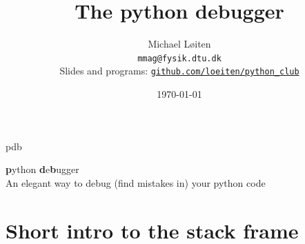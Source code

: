 \documentclass[
    size=20pt,
    style=sailor,
    display=slides,
    paper=smartboard,
    orient=landscape,
]{powerdot}
\title{The python debugger}
\author{Michael L{\o}iten\\
\texttt{mmag@fysik.dtu.dk}\\
Slides and programs:
\href{https://github.com/loeiten/python_club/tree/master/15.04.29-pdb_debugger}{
\texttt{github.com/loeiten/python\_club}} }
\date{\today}
\begin{document}
\maketitle


\begin{slide}{pdb}
\vspace*{4cm}
\begin{center}
 \textbf{p}ython \textbf{d}e\textbf{b}ugger\\
 An elegant way to debug (find mistakes in) your python code
\end{center}
\end{slide}




\section{Short intro to the stack frame}
\end{document}
